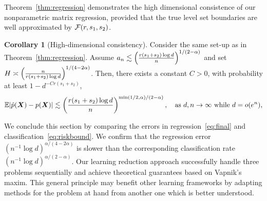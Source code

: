 \documentclass[11pt]{article}
\theoremstyle{definition}
\newtheorem{corollary}{Corollary}[section]
\newtheorem{example}{Example}
\begin{document}
Theorem~\ref{thm:regression} demonstrates the high dimensional consistence of our nonparametric matrix regression, provided that the true level set boundaries are well approximated by  $\mathcal{F}(r,s_1,s_2)$.

\begin{corollary}[High-dimensional consistency] Consider the same set-up as in Theorem~\ref{thm:regression}. Assume $a_n \lesssim \left({r(s_1+s_2)\log d \over n}\right)^{1/(2-\alpha)}$ and set $H\asymp \left({n\over r(s_1+s_2) \log d}\right)^{1/(4-2\alpha)}$.
Then, there exists a constant $C>0$, with probability at least $1-d^{-Cr(s_1+s_2)}$, 
\begin{equation}\label{eq:final}
\mathbb{E}|\hat p(\bm X)- p(\bm X)| \lesssim \left({r(s_1+s_2)\log d \over n}\right)^{\min(1/2,\alpha)/(2-\alpha)}, \quad \text{as }d, n\to\infty \text{ while } d=o(e^{n}),
\end{equation}
\end{corollary}

We conclude this section by comparing the errors in regression~\eqref{eq:final} and classification~\eqref{eq:riskbound}. We confirm that the regression error $(n^{-1}\log d)^{\alpha/(4-2\alpha)}$ is slower than the corresponding classification rate $(n^{-1}\log d)^{\alpha/(2-\alpha)}$. Our learning reduction approach successfully handle three  problems sequentially and achieve theoretical guarantees based on Vapnik's maxim. This general principle may benefit other learning frameworks by adapting methods for the problem at hand from another one which is better understood.  


\end{document}
